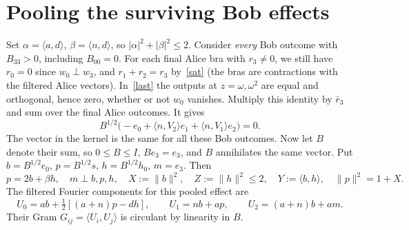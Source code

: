 \documentclass[11pt]{article}
\begin{document}
\section{Pooling the surviving Bob effects}
Set $\alpha=\langle a,d\rangle$, $\beta=\langle n,d\rangle$, so $|\alpha|^2+|\beta|^2\le2$. Consider \emph{every} Bob outcome with $B_{33}>0$, including $B_{00}=0$. For each final Alice bra with $r_3\ne0$, we still have $r_0=0$ since $w_0\perp w_3$, and $r_1+r_2=r_3$ by~\eqref{sat} (the bras are contractions with the filtered Alice vectors). In~\eqref{last} the outputs at $z=\omega,\omega^2$ are equal and orthogonal, hence zero, whether or not $w_0$ vanishes. Multiply this identity by $\bar r_3$ and sum over the final Alice outcomes. It gives
\[
  B^{1/2}\bigl(-e_0+\langle n,V_2\rangle e_1+\langle n,V_1\rangle e_2\bigr)=0 .
\]
The vector in the kernel is the same for all these Bob outcomes. Now let $B$ denote their sum, so $0\le B\le I$, $Be_3=e_3$, and $B$ annihilates the same vector. Put $b=B^{1/2}e_0$, $p=B^{1/2}s$, $h=B^{1/2}h_0$, $m=e_3$. Then
\begin{equation} p=2b+\beta h,\quad m\perp b,p,h,\quad
 X:=\|b\|^2,\quad Z:=\|h\|^2\le2,\quad Y:=\langle b,h\rangle,\quad \|p\|^2=1+X.\label{geom}\end{equation}
The filtered Fourier components for this pooled effect are
\[
 U_0=ab+\tfrac12[(a+n)p-dh],\qquad U_1=nb+ap,\qquad U_2=(a+n)b+am .
\]
Their Gram $G_{ij}=\langle U_i,U_j\rangle$ is circulant by linearity in $B$.
\end{document}
